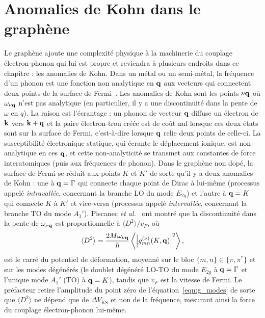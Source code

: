 \section{Anomalies de Kohn dans le graphène}\label{sec:g_kohn}

Le graphène ajoute une complexité physique à la machinerie du couplage électron-phonon qui lui est propre et reviendra à plusieurs endroits dans ce chapitre : les anomalies de Kohn. Dans un métal ou un semi-métal, la fréquence d'un phonon est une fonction non analytique en $\mathbf{q}$ aux vecteurs qui connectent deux points de la surface de Fermi~\cite{kohnImageFermiSurface1959}. Les anomalies de Kohn sont les points $\nu\mathbf{q}$ où $\omega_{\nu\mathbf{q}}$ n'est pas analytique (en particulier, il y a une discontinuité dans la pente de $\omega$ en $q$). La raison est l'écrantage : un phonon de vecteur $\mathbf{q}$ diffuse un électron de $\mathbf{k}$ vers $\mathbf{k}+\mathbf{q}$ et la paire électron-trou créée est de coût nul lorsque ces deux états sont sur la surface de Fermi, c'est-à-dire lorsque $\mathbf{q}$ relie deux points de celle-ci. La susceptibilité électronique statique, qui écrante le déplacement ionique, est non analytique en ces $\mathbf{q}$, et cette non-analyticité se transmet aux constantes de force interatomiques (puis aux fréquences de phonon). Dans le graphène non dopé, la surface de Fermi se réduit aux points $K$ et $K'$ de sorte qu'il y a deux anomalies de Kohn : une à $\mathbf{q}=\Gamma$ qui connecte chaque point de Dirac à lui-même (processus appelé \textit{intravallée}, concernant la branche LO du mode $E_{2g}$) et l'autre à $\mathbf{q}=K$ qui connecte $K$ à $K'$ et vice-versa (processus appelé \textit{intervallée}, concernant la branche TO du mode $A_1'$). Piscanec \textit{et al.}~\cite{piscanecKohnAnomaliesElectronPhonon2004} ont montré que la discontinuité dans la pente de $\omega_{\nu\mathbf{q}}$ est proportionnelle à $\langle D^2\rangle/v_F$, où
\begin{equation}
    \langle D^2\rangle = \frac{2M\omega_{\nu\mathbf{q}}}{\hbar}\left\langle\left|g^{(\nu)}_{mn}(K,\mathbf{q})\right|^2\right\rangle,\label{eqn:D2}
\end{equation}
est le carré du potentiel de déformation, moyenné sur le bloc $\{m,n\}\in\{\pi,\pi^*\}$ et sur les modes dégénérés (le doublet dégénéré LO-TO du mode $E_{2g}$ à $\mathbf{q}=\Gamma$ et l'unique mode $A_1'$ (TO) à $\mathbf{q}=K$), tandis que $v_F$ est la vitesse de Fermi. Le préfacteur retire l'amplitude du point zéro de l'équation~\eqref{eqn:g_modes} de sorte que $\langle D^2\rangle$ ne dépend que de $\Delta V_\text{KS}$ et non de la fréquence, mesurant ainsi la force du couplage électron-phonon lui-même.

